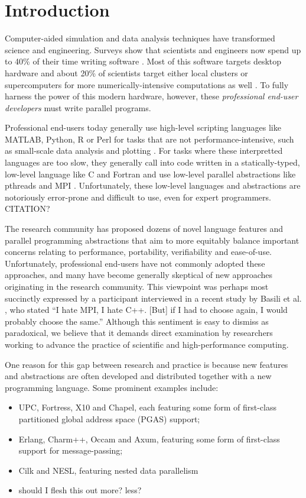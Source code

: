 \documentclass[10pt, conference, compsocconf]{IEEEtran}
\begin{document}
\section{Introduction}

Computer-aided simulation and data analysis techniques have transformed science and engineering. Surveys show that scientists and engineers now spend up to 40\% of their time writing software \cite{howison2011scientific, hannay2009scientists}. Most of this software targets desktop hardware and about 20\% of scientists target either local clusters or super\-computers for more numerically-intensive computations as well \cite{hannay2009scientists}. To fully harness the power of this modern hardware, however, these {\em professional end-user developers} \cite{segal2007some} must write parallel programs.

Professional end-users today generally use high-level scripting languages like MATLAB, Python, R or Perl for tasks that are not performance-intensive, such as small-scale data analysis and plotting \cite{nguyen2010survey}. For tasks where these interpretted languages are too slow, they generally call into code written in a statically-typed, low-level language like C and Fortran and use low-level parallel abstractions like pthreads and MPI \cite{4222616,basili2008understanding}. Unfortunately, these low-level languages and abstractions are notoriously error-prone and difficult to use, even for expert programmers. {\color{red} CITATION?}

The research community has proposed dozens of novel language features and parallel programming abstractions that aim to  more equitably balance important concerns relating to performance, portability, verifiability and ease-of-use. Unfortunately, professional end-users have not commonly adopted these approaches, and many have become generally skeptical of new approaches originating in the research community. This viewpoint was perhaps most succinctly expressed by a participant interviewed in a recent study by Basili et al. \cite{basili2008understanding}, who stated ``I hate MPI, I hate C++. [But] if I had to choose again, I would probably choose the same.'' Although this sentiment is easy to dismiss as paradoxical, we believe that it demands direct examination by researchers working to advance the practice of scientific and high-performance computing. 

One reason for this gap between research and practice is because new features and abstractions are often developed and distributed together with a new programming language. Some prominent examples include:
\begin{itemize}
\item UPC, Fortress, X10 and Chapel, each featuring some form of first-class partitioned global address space (PGAS) support;
\item Erlang, Charm++, Occam and Axum, featuring some form of first-class support for message-passing; 
\item Cilk and NESL, featuring nested data parallelism
\item {\color{red} should I flesh this out more? less?}
\end{itemize}
\end{document}
